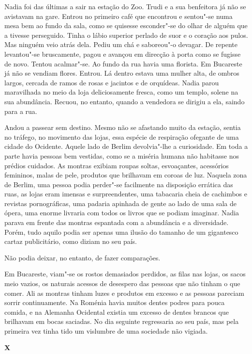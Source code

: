 Nadia foi das últimas a sair na estação do Zoo. Trudi
e a sua benfeitora já não se avistavam na gare. Entrou no primeiro café
que encontrou e sentou"-se numa mesa bem ao fundo da sala, como se
quisesse esconder"-se do olhar de alguém que a tivesse perseguido. Tinha
o lábio superior perlado de suor e o coração aos pulos. Mas ninguém veio
atrás dela. Pediu um chá e saboreou"-o devagar. De repente levantou"-se
bruscamente, pagou e avançou em direcção à porta como se fugisse de
novo. Tentou acalmar"-se. Ao fundo da rua havia uma florista. Em
Bucareste já não se vendiam flores. Entrou. Lá dentro estava uma mulher
alta, de ombros largos, cercada de ramos de rosas e jacintos e de
orquídeas. Nadia parou maravilhada no meio da loja deliciosamente
fresca, como um templo, solene na sua abundância. Recuou, no entanto,
quando a vendedora se dirigiu a ela, saindo para a rua.


Andou a passear sem destino. Mesmo não se afastando muito da estação,
sentia no tráfego, no movimento das lojas, essa espécie de respiração
ofegante de uma cidade do Ocidente. Aquele lado de Berlim devolvia"-lhe a
curiosidade. Em toda a parte havia pessoas bem vestidas, como se a
miséria humana não habitasse nos prédios cuidados. As montras exibiam
roupas soltas, esvoaçantes, acessórios femininos, malas de pele,
produtos que brilhavam em coroas de luz. Naquela zona de Berlim, uma
pessoa podia perder"-se facilmente na disposição errática das ruas, as
lojas eram imensas e surpreendentes, uma tabacaria cheia de cachimbos e
revistas pornográficas, uma padaria apinhada de gente ao lado de uma
sala de ópera, uma enorme livraria com todos os livros que se podiam
imaginar. Nadia parava em frente das montras espantada com a
abundância e a diversidade. Porém, tudo aquilo podia ser apenas uma
ilusão do tamanho de um gigantesco cartaz publicitário, como diziam no
seu país.

Não podia deixar, no entanto, de fazer comparações.

Em Bucareste, viam"-se os rostos demasiados perdidos, as filas nas lojas,
os sacos meio vazios, os naturais acessos de desespero das pessoas que
não tinham o que comer. Ali as montras tinham luzes e produtos em
excesso e as pessoas pareciam sorrir continuamente. Na Roménia havia
muitos dentes podres para pouca comida, e na Alemanha Ocidental
existia um excesso de dentes brancos que brilhavam em bocas saciadas.
No dia seguinte regressaria ao seu país, mas pela primeira vez tinha
tido um vislumbre de uma sociedade não vigiada.


\pagebreak
\vspace*{1.8cm}
\noindent{}\textbf{X}

